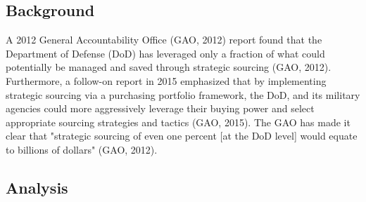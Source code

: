 \documentclass[twocolumn]{svjour3}       %
\begin{document}
\subsection{Background}
\label{sec:5.1}

A 2012 General Accountability Office (GAO, 2012) report found that the Department of Defense (DoD) has leveraged only a fraction of what could potentially be managed and saved through strategic sourcing (GAO, 2012).  Furthermore, a follow-on report in 2015 emphasized that by implementing strategic sourcing via a purchasing portfolio framework, the DoD, and its military agencies could more aggressively leverage their buying power and select appropriate sourcing strategies and tactics (GAO, 2015).  The GAO has made it clear that "strategic sourcing of even one percent [at the DoD level] would equate to billions of dollars" (GAO, 2012).



\subsection{Analysis}
\label{sec:5.2}
\end{document}

